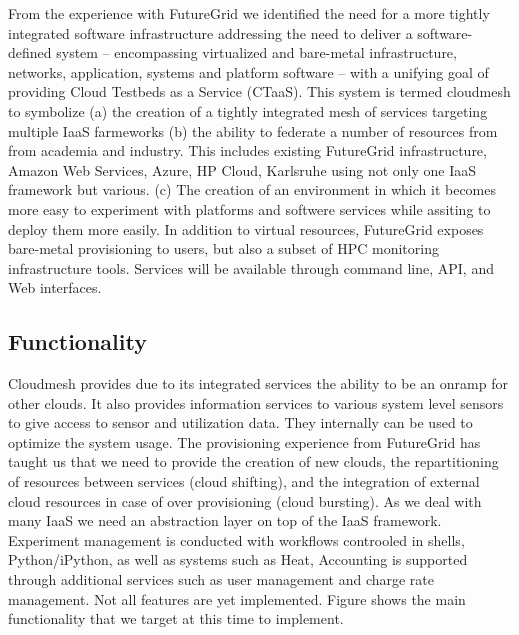 \documentclass{article}
\begin{document}
From the experience with FutureGrid we identified the need for a more
tightly integrated software infrastructure addressing the need to
deliver a software-defined system – encompassing virtualized and
bare-metal infrastructure, networks, application, systems and platform
software – with a unifying goal of providing Cloud Testbeds as a
Service (CTaaS). This system is termed cloudmesh to symbolize (a) the
creation of a tightly integrated mesh of services targeting multiple
IaaS farmeworks (b) the ability to federate a number of resources from
from academia and industry. This includes existing FutureGrid
infrastructure, Amazon Web Services, Azure, HP Cloud, Karlsruhe using
not only one IaaS framework but various. (c) The creation of an
environment in which it becomes more easy to experiment with platforms
and softwere services while assiting to deploy them more easily.
In addition to virtual resources, FutureGrid exposes bare-metal
provisioning to users, but also a subset of HPC monitoring
infrastructure tools. Services will be available through command line,
API, and Web interfaces.

\subsection{Functionality}

Cloudmesh provides due to its integrated services the ability to be an
onramp for other clouds. It also provides information services to
various system level sensors to give access to sensor and utilization
data. They internally can be used to optimize the system
usage. The provisioning experience from FutureGrid has taught us that
we need to provide the creation of new clouds, the repartitioning of
resources between services (cloud shifting), and the integration of
external cloud resources in case of over provisioning (cloud
bursting). As we deal with many IaaS we need an abstraction layer on
top of the IaaS framework. Experiment management is conducted with
workflows controoled in shells, Python/iPython, as well as systems
such as Heat, Accounting is supported through additional services such
as user management and charge rate management. Not all features are
yet implemented. Figure \label{F:cm-func} shows the main functionality
that we target at this time to implement.
\end{document}
